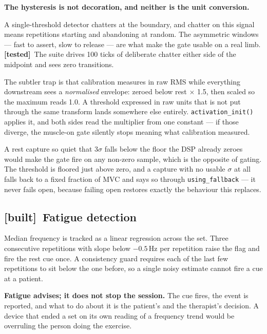 \documentclass[11pt]{article}
\newcommand{\built}{{\sffamily\scriptsize\color{good}\textbf{[built]}}\ }
\newcommand{\tested}{{\sffamily\scriptsize\color{annot}\textbf{[tested]}}\ }
\begin{document}
\begin{callout}
\textbf{The hysteresis is not decoration, and neither is the unit conversion.}

\medskip
A single-threshold detector chatters at the boundary, and chatter on this
signal means repetitions starting and abandoning at random. The asymmetric
windows --- fast to assert, slow to release --- are what make the gate usable
on a real limb. \tested The suite drives 100 ticks of deliberate chatter
either side of the midpoint and sees zero transitions.

\medskip
The subtler trap is that calibration measures in raw RMS while everything
downstream sees a \emph{normalised} envelope: zeroed below rest $\times$ 1.5,
then scaled so the maximum reads 1.0. A threshold expressed in raw units that
is not put through the same transform lands somewhere else entirely.
\texttt{activation\_init()} applies it, and both sides read the multiplier
from one constant --- if those diverge, the muscle-on gate silently stops
meaning what calibration measured.

\medskip
A rest capture so quiet that $3\sigma$ falls below the floor the DSP already
zeroes would make the gate fire on any non-zero sample, which is the opposite
of gating. The threshold is floored just above zero, and a capture with no
usable $\sigma$ at all falls back to a fixed fraction of MVC and says so
through \texttt{using\_fallback} --- it never fails open, because failing open
restores exactly the behaviour this replaces.
\end{callout}

\subsection{\built Fatigue detection}

Median frequency is tracked as a linear regression across the set. Three
consecutive repetitions with slope below $-0.5$\,Hz per repetition raise the
flag and fire the rest cue once. A consistency guard requires each of the last
few repetitions to sit below the one before, so a single noisy estimate cannot
fire a cue at a patient.

\medskip
\noindent
\textbf{Fatigue advises; it does not stop the session.} The cue fires, the
event is reported, and what to do about it is the patient's and the
therapist's decision. A device that ended a set on its own reading of a
frequency trend would be overruling the person doing the exercise.
\end{document}
